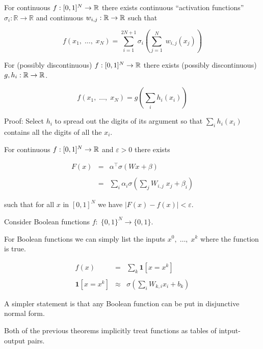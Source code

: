 {For continuous $f: [0,1]^N \rightarrow \mathbb{R}$ there exists continuous
``activation functions'' $\sigma_i: \mathbb{R} \rightarrow \mathbb{R}$ and continuous $w_{i,j} : \mathbb{R} \rightarrow \mathbb{R}$ such that


\vfill
$$f(x_1,\;\ldots,\;x_N)=\sum _{{i=1}}^{{2N+1}} \sigma_i \left(\sum_{j=1}^N\;w_{i,j}(x_j)\right)$$




For (possibly discontinuous) $f: [0,1]^N \rightarrow \mathbb{R}$ there exists (possibly discontinuous)
$g, h_i: \mathbb{R} \rightarrow \mathbb{R}$.

\vfill
$$f(x_1,\;\ldots,\;x_N) = g\left(\sum_i h_i(x_i)\right)$$

\vfill
Proof: Select $h_i$ to spread out the digits of its argument so that $\sum_i h_i(x_i)$ contains all the digits of all the $x_i$.


For continuous $f: [0,1]^N \rightarrow \mathbb{R}$ and $\varepsilon >0$ there exists

\vfill
\begin{eqnarray*}
  F(x) &= & \alpha^\top \sigma(Wx + \beta) \\
  \\
  & = & \sum_i \alpha_i \sigma\left(\sum_j W_{i,j} \;x_j + \beta_i\right)
\end{eqnarray*}


\vfill
such that for all $x$ in $[0,1]^N$ we have $| F( x ) - f ( x ) | < \varepsilon$.


Consider Boolean functions $f:\;\{0,1\}^N \rightarrow \{0,1\}$.

\vfill
For Boolean functions we can simply list the inputs $x^0,\;\ldots,\;x^k$ where the function is true.

\begin{eqnarray*}
  f(x) & = & \sum_k \mathbf{1}[x=x^k] \\
  \\
  \mathbf{1}[x = x^k] & \approx & \sigma\left(\sum_i W_{k,i} x_i + b_k\right)
\end{eqnarray*}

\vfill
A simpler statement is that any Boolean function can be put in disjunctive normal form.


Both of the previous theorems implicitly treat functions as tables of intput-output pairs.

}
